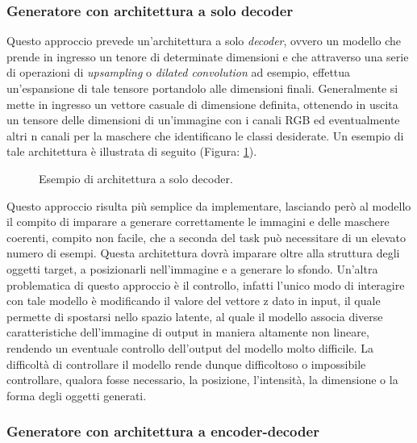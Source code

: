 \subsubsection{Generatore con architettura a solo decoder}

    Questo approccio prevede un'architettura a solo \textit{decoder}, ovvero un modello che prende in ingresso un tenore di determinate dimensioni e
    che attraverso una serie di operazioni di \textit{upsampling} o \textit{dilated convolution} ad esempio, effettua un'espansione di tale tensore
    portandolo alle dimensioni finali. 
    Generalmente si mette in ingresso un vettore casuale di dimensione definita, ottenendo in uscita un tensore delle dimensioni di un'immagine con i canali RGB 
    ed eventualmente altri n canali per la maschere che identificano le classi desiderate.
    Un esempio di tale architettura è illustrata di seguito (Figura: \ref{fig:decoder_only_architecture}).

    \begin{figure}[H]
        \centering
        
        \caption{Esempio di architettura a solo decoder.}
        \label{fig:decoder_only_architecture}
    \end{figure}

    Questo approccio risulta più semplice da implementare, lasciando però al modello il compito di imparare a generare correttamente
    le immagini e delle maschere coerenti, compito non facile, che a seconda del task può necessitare di un elevato numero di esempi. 
    Questa architettura dovrà imparare oltre alla struttura degli oggetti target, a posizionarli nell'immagine e a generare lo sfondo.
    Un'altra problematica di questo approccio è il controllo, infatti l'unico modo di interagire con tale modello è modificando il valore
    del vettore z dato in input, il quale permette di spostarsi nello spazio latente, al quale il modello associa diverse caratteristiche dell'immagine
    di output in maniera altamente non lineare, rendendo un eventuale controllo dell'output del modello molto difficile.
    La difficoltà di controllare il modello rende dunque difficoltoso o impossibile controllare, qualora fosse necessario, la posizione, l'intensità,
    la dimensione o la forma degli oggetti generati.

\subsubsection{Generatore con architettura a encoder-decoder}

